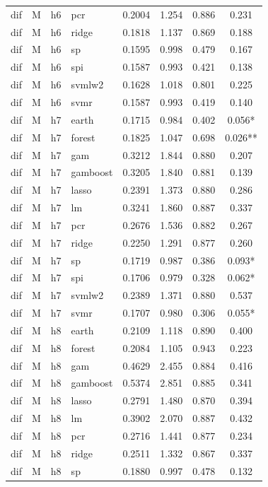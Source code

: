 \begin{ThreePartTable}
\begin{longtable}[t]{llclcccc}
dif & M & h6 & pcr & 0.2004 & 1.254 & 0.886 & 0.231\\
dif & M & h6 & ridge & 0.1818 & 1.137 & 0.869 & 0.188\\
dif & M & h6 & sp & 0.1595 & 0.998 & 0.479 & 0.167\\
dif & M & h6 & spi & 0.1587 & 0.993 & 0.421 & 0.138\\
dif & M & h6 & svmlw2 & 0.1628 & 1.018 & 0.801 & 0.225\\
dif & M & h6 & svmr & 0.1587 & 0.993 & 0.419 & 0.140\\
\addlinespace
dif & M & h7 & earth & 0.1715 & 0.984 & 0.402 & 0.056*\\
dif & M & h7 & forest & 0.1825 & 1.047 & 0.698 & 0.026**\\
dif & M & h7 & gam & 0.3212 & 1.844 & 0.880 & 0.207\\
dif & M & h7 & gamboost & 0.3205 & 1.840 & 0.881 & 0.139\\
dif & M & h7 & lasso & 0.2391 & 1.373 & 0.880 & 0.286\\
dif & M & h7 & lm & 0.3241 & 1.860 & 0.887 & 0.337\\
dif & M & h7 & pcr & 0.2676 & 1.536 & 0.882 & 0.267\\
dif & M & h7 & ridge & 0.2250 & 1.291 & 0.877 & 0.260\\
dif & M & h7 & sp & 0.1719 & 0.987 & 0.386 & 0.093*\\
dif & M & h7 & spi & 0.1706 & 0.979 & 0.328 & 0.062*\\
dif & M & h7 & svmlw2 & 0.2389 & 1.371 & 0.880 & 0.537\\
dif & M & h7 & svmr & 0.1707 & 0.980 & 0.306 & 0.055*\\
\addlinespace
dif & M & h8 & earth & 0.2109 & 1.118 & 0.890 & 0.400\\
dif & M & h8 & forest & 0.2084 & 1.105 & 0.943 & 0.223\\
dif & M & h8 & gam & 0.4629 & 2.455 & 0.884 & 0.416\\
dif & M & h8 & gamboost & 0.5374 & 2.851 & 0.885 & 0.341\\
dif & M & h8 & lasso & 0.2791 & 1.480 & 0.870 & 0.394\\
dif & M & h8 & lm & 0.3902 & 2.070 & 0.887 & 0.432\\
dif & M & h8 & pcr & 0.2716 & 1.441 & 0.877 & 0.234\\
dif & M & h8 & ridge & 0.2511 & 1.332 & 0.867 & 0.337\\
dif & M & h8 & sp & 0.1880 & 0.997 & 0.478 & 0.132\\

\end{longtable}
\end{ThreePartTable}
